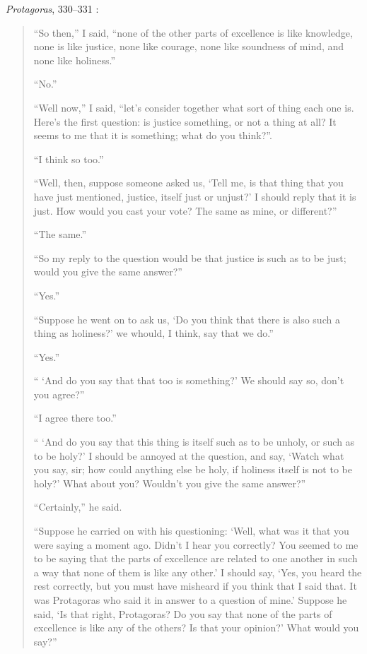 \documentclass{article}
\theoremstyle{definition}
\begin{document}
{\em Protagoras}, 330--331 \cite[pp.~27--28]{taylorprotagoras}:
\begin{quote}
``So then,'' I said, ``none of the other parts of excellence is like knowledge, none is like justice, none like courage, none like soundness of mind, and none like
holiness.''

``No.''

``Well now,'' I said, ``let's consider together what sort of thing each one
is. Here's the first question: is justice something, or not a thing at all? It seems to me that it is something; what do you think?''.

``I think so too.''

``Well, then, suppose someone asked us, `Tell me, is that thing that you have just mentioned,
justice, itself just or unjust?' I should reply that it is just. How would you cast your vote? The same as mine, or different?''

``The same.''

``So my reply to the question would be that justice is such as to be just; would you give the same answer?''

``Yes.''

``Suppose he went on to ask us, `Do you think that there is also such a thing as holiness?' we whould, I think, say that we do.''

``Yes.''

`` `And do you say that that too is something?' We should say so, don't you agree?''

``I agree there too.''

`` `And do you say that this thing is itself such as to be unholy, or such as to be holy?' I should be annoyed at the question, and say, `Watch what you say,
sir; how could anything else be holy, if holiness itself is not to be holy?' What about you? Wouldn't you give the same answer?''

``Certainly,'' he said.

``Suppose he carried on with his questioning: `Well, what was it that you were saying a moment ago. Didn't I hear you correctly? You seemed to me to be saying that the 
parts of excellence are related to one another in such a way that none of them is like any other.' I should say, `Yes, you heard the rest correctly, but you must have misheard if you think
that I said that. It was Protagoras who said it in answer to a question of mine.' Suppose he said, `Is that right, Protagoras? Do you say that none of the parts of excellence
is like any of the others? Is that your opinion?' What would you say?''


\end{quote}
\end{document}
